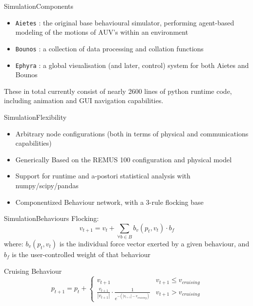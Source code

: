 \documentclass[10pt]{beamer}
\begin{document}
\begin{frame}{Simulation}{Components}

  \begin{itemize}
    \item \texttt{Aietes} : the original base behavioural simulator, performing agent-based modeling of the motions of AUV's within an environment
    \item \texttt{Bounos} : a collection of data processing and collation functions
    \item \texttt{Ephyra} : a global visualisation (and later, control) system for both Aietes and Bounos
  \end{itemize}
  These in total currently consist of nearly 2600 lines of python runtime code, including animation and GUI navigation capabilities.

\end{frame}

\begin{frame}{Simulation}{Flexibility}
  \begin{itemize}
    \item Arbitrary node configurations (both in terms of physical and communications capabilities)
    \item Generically Based on the REMUS 100 configuration and physical model
    \item Support for runtime and a-postori statistical analysis with numpy/scipy/pandas
    \item Componentized Behaviour network, with a 3-rule flocking base
  \end{itemize}
\end{frame}

\begin{frame}{Simulation}{Behaviours}
  Flocking: 
  \begin{equation}
    v_{t+1}=v_t+\sum_{\forall b \in B}{b_v(p_t,v_t) \cdot b_f}
  \end{equation}
  where: 
  $b_v(p_t,v_t)$ is the individual force vector exerted by a given behaviour, and 
  $b_f$ is the user-controlled weight of that behaviour

  Cruising Behaviour
  \begin{equation}
    p_{t+1}=p_t + 
    \begin{cases}
      v_{t+1} & v_{t+1}\leq v_{cruising}\\
      \frac{v_{t+1}} {|v_{t+1}|} \cdot \frac{1}{e^{-(|v_{t+1}|-v_{cruising})}} & v_{t+1}>v_{cruising}
    \end{cases}
  \end{equation}
\end{frame}
\end{document}
